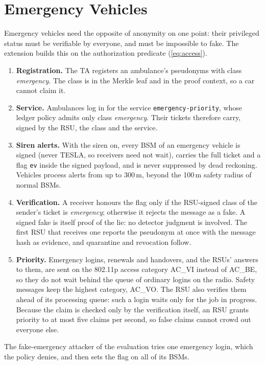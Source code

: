\section{Emergency Vehicles}\label{sec:emergency}

Emergency vehicles need the opposite of anonymity on one point: their privileged status must be
verifiable by everyone, and must be impossible to fake. The extension builds this on the
authorization predicate (\ref{eq:access}).
\begin{enumerate}
  \item \textbf{Registration.} The TA registers an ambulance's pseudonyms with class
  \textit{emergency}. The class is in the Merkle leaf and in the proof context,
  so a car cannot claim it.
  \item \textbf{Service.} Ambulances log in for the service \texttt{emergency-priority}, whose ledger
  policy admits only class \textit{emergency}. Their tickets therefore carry, signed by the RSU, the
  class and the service.
  \item \textbf{Siren alerts.} With the siren on, every BSM of an emergency vehicle is signed (never
  TESLA, so receivers need not wait), carries the full ticket and a flag \texttt{ev} inside the
  signed payload, and is never suppressed by dead reckoning. Vehicles process alerts from up to
  300\,m, beyond the 100\,m safety radius of normal BSMs.
  \item \textbf{Verification.} A receiver honours the flag only if the RSU-signed class of the
  sender's ticket is \textit{emergency}; otherwise it rejects the message as a fake. A signed fake is
  itself proof of the lie: no detector judgment is involved. The first RSU that receives one reports
  the pseudonym at once with the message hash as evidence, and quarantine and revocation follow.
  \item \textbf{Priority.} Emergency logins, renewals and handovers, and the RSUs' answers to
  them, are sent on the 802.11p access category AC\_VI instead of AC\_BE, so they do not wait
  behind the queue of ordinary logins on the radio. Safety messages keep the highest category,
  AC\_VO. The RSU also verifies them ahead of its processing queue: such a login waits only for the
  job in progress. Because the claim is checked only by the verification itself, an RSU grants
  priority to at most five claims per second, so false claims cannot crowd out everyone else.
\end{enumerate}
The fake-emergency attacker of the evaluation tries one emergency login, which the policy denies,
and then sets the flag on all of its BSMs.
